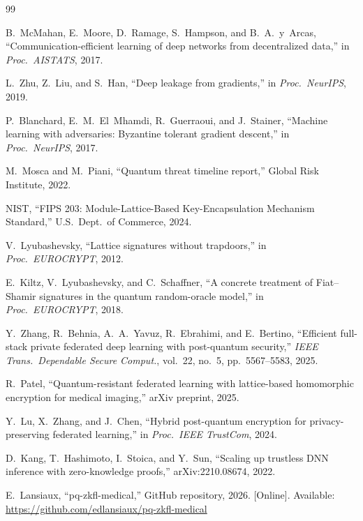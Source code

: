 \documentclass[conference]{IEEEtran}
\begin{document}
\balance
\begin{thebibliography}{99}

B.~McMahan, E.~Moore, D.~Ramage, S.~Hampson, and B.~A.~y~Arcas, ``Communication-efficient learning of deep networks from decentralized data,'' in \emph{Proc.\ AISTATS}, 2017.

L.~Zhu, Z.~Liu, and S.~Han, ``Deep leakage from gradients,'' in \emph{Proc.\ NeurIPS}, 2019.

P.~Blanchard, E.~M.~El~Mhamdi, R.~Guerraoui, and J.~Stainer, ``Machine learning with adversaries: Byzantine tolerant gradient descent,'' in \emph{Proc.\ NeurIPS}, 2017.

M.~Mosca and M.~Piani, ``Quantum threat timeline report,'' Global Risk Institute, 2022.

NIST, ``FIPS 203: Module-Lattice-Based Key-Encapsulation Mechanism Standard,'' U.S.\ Dept.\ of Commerce, 2024.

V.~Lyubashevsky, ``Lattice signatures without trapdoors,'' in \emph{Proc.\ EUROCRYPT}, 2012.

E.~Kiltz, V.~Lyubashevsky, and C.~Schaffner, ``A concrete treatment of Fiat--Shamir signatures in the quantum random-oracle model,'' in \emph{Proc.\ EUROCRYPT}, 2018.

Y.~Zhang, R.~Behnia, A.~A.~Yavuz, R.~Ebrahimi, and E.~Bertino, ``Efficient full-stack private federated deep learning with post-quantum security,'' \emph{IEEE Trans.\ Dependable Secure Comput.}, vol.~22, no.~5, pp.~5567--5583, 2025.

R.~Patel, ``Quantum-resistant federated learning with lattice-based homomorphic encryption for medical imaging,'' arXiv preprint, 2025.

Y.~Lu, X.~Zhang, and J.~Chen, ``Hybrid post-quantum encryption for privacy-preserving federated learning,'' in \emph{Proc.\ IEEE TrustCom}, 2024.

D.~Kang, T.~Hashimoto, I.~Stoica, and Y.~Sun, ``Scaling up trustless DNN inference with zero-knowledge proofs,'' arXiv:2210.08674, 2022.

E.~Lansiaux, ``pq-zkfl-medical,'' GitHub repository, 2026. [Online]. Available: \url{https://github.com/edlansiaux/pq-zkfl-medical}

\end{thebibliography}
\end{document}
